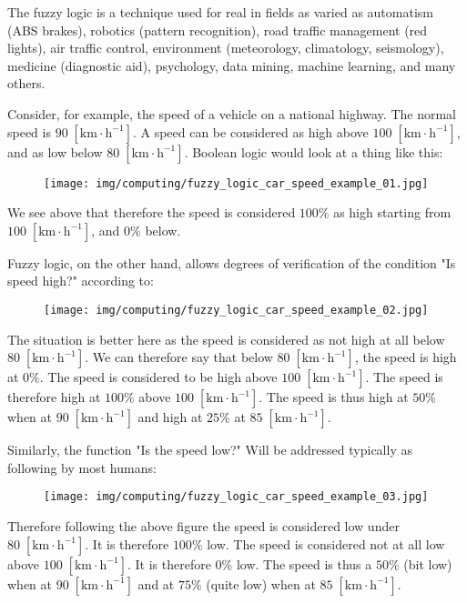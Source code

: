 	\begin{tcolorbox}[title=Remark,colframe=black,arc=10pt]
	The fuzzy logic is a technique used for real in fields as varied as automatism (ABS brakes), robotics (pattern recognition), road traffic management (red lights), air traffic control, environment (meteorology, climatology, seismology), medicine (diagnostic aid), psychology, data mining, machine learning, and many others.
	\end{tcolorbox}
	Consider, for example, the speed of a vehicle on a national highway. The normal speed is $90\;[\text{km}\cdot\text{h}^{-1}]$. A speed can be considered as high above  $100\;[\text{km}\cdot\text{h}^{-1}]$, and as low below $80\;[\text{km}\cdot\text{h}^{-1}]$. Boolean logic would look at a thing like this:
	\begin{figure}[H]
		\centering
		\texttt{[image: img/computing/fuzzy\_logic\_car\_speed\_example\_01.jpg]}
	\end{figure}
	We see above that therefore the speed is considered $100\%$ as high starting from $100\;[\text{km}\cdot\text{h}^{-1}]$, and $0\%$ below.

	Fuzzy logic, on the other hand, allows degrees of verification of the condition "Is speed high?" according to:
	\begin{figure}[H]
		\centering
		\texttt{[image: img/computing/fuzzy\_logic\_car\_speed\_example\_02.jpg]}
	\end{figure}
	The situation is better here as the speed is considered as not high at all  below $80\;[\text{km}\cdot\text{h}^{-1}]$. We can therefore say that below $80\;[\text{km}\cdot\text{h}^{-1}]$, the speed is high at $0\%$. The speed is considered to be high above $100\;[\text{km}\cdot\text{h}^{-1}]$. The speed is therefore high at $100\%$ above $100\;[\text{km}\cdot\text{h}^{-1}]$. The speed is thus high at $50\%$ when at $90\;[\text{km}\cdot\text{h}^{-1}]$ and high at $25\%$ at $85\;[\text{km}\cdot\text{h}^{-1}]$.

	Similarly, the function "Is the speed low?" Will be addressed typically as following by most humans:
	\begin{figure}[H]
		\centering
		\texttt{[image: img/computing/fuzzy\_logic\_car\_speed\_example\_03.jpg]}
	\end{figure}
	Therefore following the above figure the speed is considered low under $80\;[\text{km}\cdot\text{h}^{-1}]$. It is therefore $100\%$ low. The speed is considered not at all low above $100\;[\text{km}\cdot\text{h}^{-1}]$. It is therefore $0\%$ low. The speed is thus a $50\%$ (bit low) when at $90\;[\text{km}\cdot\text{h}^{-1}]$ and at $75\%$ (quite low) when at $85\;[\text{km}\cdot\text{h}^{-1}]$.
	
